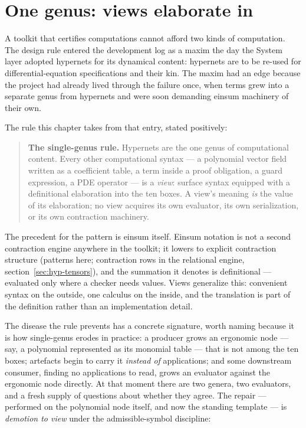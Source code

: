 \section{One genus: views elaborate in}
\label{sec:hyp-genus}

A toolkit that certifies computations cannot afford two kinds of
computation. The design rule entered the development log as a maxim
the day the System layer adopted hypernets for its dynamical content:
hypernets are to be re-used for
differential-equation specifications and their kin. The maxim had an
edge because the project had already lived through the failure once,
when terms grew into a separate genus from hypernets and were soon
demanding einsum machinery of their own.

The rule this chapter takes from that entry, stated positively:

\begin{quote}
\textbf{The single-genus rule.} Hypernets are the one genus of
computational content. Every other computational syntax --- a
polynomial vector field written as a coefficient table, a term inside
a proof obligation, a guard expression, a PDE operator --- is a
\emph{view}: surface syntax equipped with a definitional elaboration
into the ten boxes. A view's meaning \emph{is} the value of its
elaboration; no view acquires its own evaluator, its own
serialization, or its own contraction machinery.
\end{quote}

The precedent for the pattern is einsum itself. Einsum notation is
not a second contraction engine anywhere in the toolkit; it lowers
to explicit contraction structure (patterns here; contraction rows in
the relational engine, section~\ref{sec:hyp-tensors}), and the
summation it denotes is definitional --- evaluated only where a
checker needs values. Views generalize this: convenient syntax on
the outside, one calculus on the inside, and the translation is part
of the definition rather than an implementation detail.

The disease the rule prevents has a concrete signature, worth naming
because it is how single-genus erodes in practice: a producer grows
an ergonomic node --- say, a polynomial represented as its monomial
table --- that is not among the ten boxes; artefacts begin to carry
it \emph{instead of} applications; and some downstream consumer,
finding no applications to read, grows an evaluator against the
ergonomic node directly. At that moment there are two genera, two
evaluators, and a fresh supply of questions about whether they agree.
The repair --- performed on the polynomial node itself, and now the
standing template --- is \emph{demotion to view} under the
admissible-symbol discipline:

